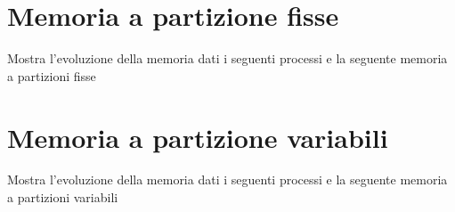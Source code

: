 \documentclass[11pt,fleqn]{book}
\begin{document}
\section{Memoria a partizione fisse}

Mostra l'evoluzione della memoria dati i seguenti processi e la seguente memoria a partizioni fisse

\immediate{}


\newpage

\section{Memoria a partizione variabili}

Mostra l'evoluzione della memoria dati i seguenti processi e la seguente memoria a partizioni variabili

\immediate{}

\end{document}

